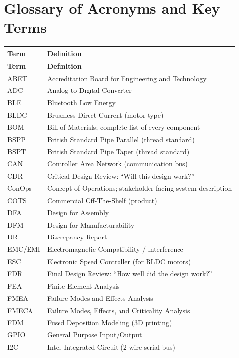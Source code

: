 \documentclass[11pt,letterpaper,twoside,openany]{book}
\begin{document}
\chapter*{Glossary of Acronyms and Key Terms}

\begin{longtable}{l p{10cm}}
\toprule
\textbf{Term} & \textbf{Definition} \\
\midrule
\endfirsthead
\toprule
\textbf{Term} & \textbf{Definition} \\
\midrule
\endhead
ABET & Accreditation Board for Engineering and Technology \\
ADC & Analog-to-Digital Converter \\
BLE & Bluetooth Low Energy \\
BLDC & Brushless Direct Current (motor type) \\
BOM & Bill of Materials; complete list of every component \\
BSPP & British Standard Pipe Parallel (thread standard) \\
BSPT & British Standard Pipe Taper (thread standard) \\
CAN & Controller Area Network (communication bus) \\
CDR & Critical Design Review: ``Will this design work?'' \\
ConOps & Concept of Operations; stakeholder-facing system description \\
COTS & Commercial Off-The-Shelf (product) \\
DFA & Design for Assembly \\
DFM & Design for Manufacturability \\
DR & Discrepancy Report \\
EMC/EMI & Electromagnetic Compatibility / Interference \\
ESC & Electronic Speed Controller (for BLDC motors) \\
FDR & Final Design Review: ``How well did the design work?'' \\
FEA & Finite Element Analysis \\
FMEA & Failure Modes and Effects Analysis \\
FMECA & Failure Modes, Effects, and Criticality Analysis \\
FDM & Fused Deposition Modeling (3D printing) \\
GPIO & General Purpose Input/Output \\
I2C & Inter-Integrated Circuit (2-wire serial bus) \\

\end{longtable}
\end{document}
